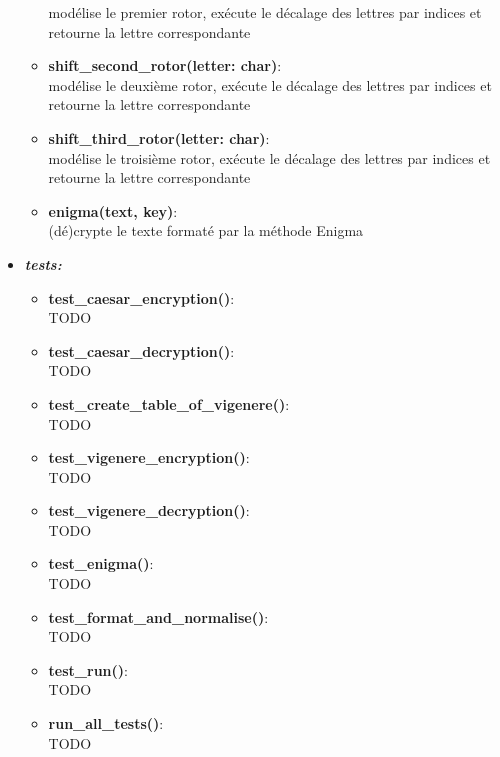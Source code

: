 \documentclass[a4paper,12pt,abstracton,titlepage]{scrartcl}
\begin{document}
\begin{itemize}
\begin{itemize}
modélise le premier rotor, exécute le décalage des lettres par indices et retourne la lettre correspondante\\
\item \textbf{shift\_second\_rotor(letter: char)}:\\
modélise le deuxième rotor, exécute le décalage des lettres par indices et retourne la lettre correspondante\\
\item \textbf{shift\_third\_rotor(letter: char)}:\\
modélise le troisième rotor, exécute le décalage des lettres par indices et retourne la lettre correspondante\\
\item \textbf{enigma(text, key)}:\\
(dé)crypte le texte formaté par la méthode Enigma\\
\end{itemize}\vspace{0.3cm}

\item \textit{\textbf{tests:}}\vspace{0.2cm}
\begin{itemize}
\item \textbf{test\_caesar\_encryption()}:\\
TODO\\
\item \textbf{test\_caesar\_decryption()}:\\
TODO\\
\item \textbf{test\_create\_table\_of\_vigenere()}:\\
TODO\\
\item \textbf{test\_vigenere\_encryption()}:\\
TODO\\
\item \textbf{test\_vigenere\_decryption()}:\\
TODO\\
\item \textbf{test\_enigma()}:\\
TODO\\
\item \textbf{test\_format\_and\_normalise()}:\\
TODO\\
\item \textbf{test\_run()}:\\
TODO\\
\item \textbf{run\_all\_tests()}:\\
TODO\\
\end{itemize}
\end{itemize}
\end{document}
